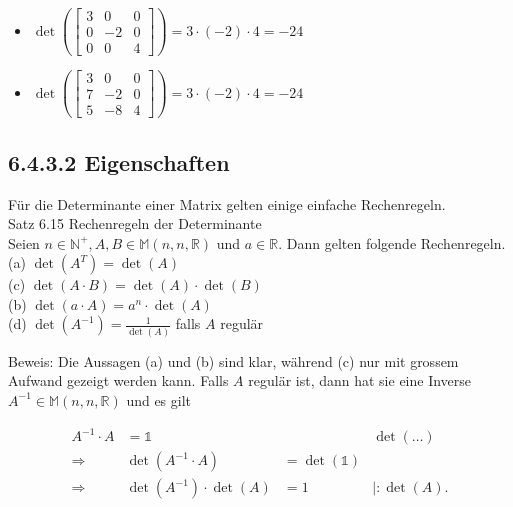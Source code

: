 \documentclass[10pt]{article}
\begin{document}
\begin{itemize}
  \item $\operatorname{det}\left(\left[\begin{array}{rrr}3 & 0 & 0 \\ 0 & -2 & 0 \\ 0 & 0 & 4\end{array}\right]\right)=3 \cdot(-2) \cdot 4=-24$
  \item $\operatorname{det}\left(\left[\begin{array}{rrr}3 & 0 & 0 \\ 7 & -2 & 0 \\ 5 & -8 & 4\end{array}\right]\right)=3 \cdot(-2) \cdot 4=-24$
\end{itemize}

\subsection*{6.4.3.2 Eigenschaften}
Für die Determinante einer Matrix gelten einige einfache Rechenregeln.\\
Satz 6.15 Rechenregeln der Determinante\\
Seien $n \in \mathbb{N}^{+}, A, B \in \mathbb{M}(n, n, \mathbb{R})$ und $a \in \mathbb{R}$. Dann gelten folgende Rechenregeln.\\
(a) $\operatorname{det}\left(A^{T}\right)=\operatorname{det}(A)$\\
(c) $\operatorname{det}(A \cdot B)=\operatorname{det}(A) \cdot \operatorname{det}(B)$\\
(b) $\operatorname{det}(a \cdot A)=a^{n} \cdot \operatorname{det}(A)$\\
(d) $\operatorname{det}\left(A^{-1}\right)=\frac{1}{\operatorname{det}(A)}$ falls $A$ regulär

Beweis: Die Aussagen (a) und (b) sind klar, während (c) nur mit grossem Aufwand gezeigt werden kann. Falls $A$ regulär ist, dann hat sie eine Inverse $A^{-1} \in \mathbb{M}(n, n, \mathbb{R})$ und es gilt


\begin{align*}
A^{-1} \cdot A & =\mathbb{1} & & \operatorname{det}(\ldots)  \tag{6.117}\\
\Rightarrow & \operatorname{det}\left(A^{-1} \cdot A\right) & =\operatorname{det}(\mathbb{1}) &  \tag{6.118}\\
\Rightarrow & \operatorname{det}\left(A^{-1}\right) \cdot \operatorname{det}(A) & =1 & \mid: \operatorname{det}(A) . \tag{6.119}
\end{align*}
\end{document}
